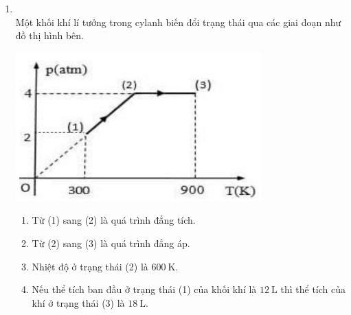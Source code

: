 \begin{enumerate}[label=\bfseries Câu \arabic*:, leftmargin=1.7cm]
\item {}\\
Một khối khí lí tưởng trong cylanh biến đổi trạng thái qua các giai đoạn như đồ thị hình bên.
\begin{center}
	\includegraphics[width=0.45\linewidth]{../figs/VN12-Y24-PH-SYL-014P-17}
\end{center}
\begin{enumerate}[label=\alph*)]
	\item Từ (1) sang (2) là quá trình đẳng tích.
	\item Từ (2) sang (3) là quá trình đẳng áp.
	\item Nhiệt độ ở trạng thái (2) là $\SI{600}{\kelvin}$.
	\item  Nếu thể tích ban đầu ở trạng thái (1) của khối khí là $\SI{12}{\liter}$ thì thể tích của khí ở trạng thái (3) là $\SI{18}{\liter}$.
\end{enumerate}

\end{enumerate}
